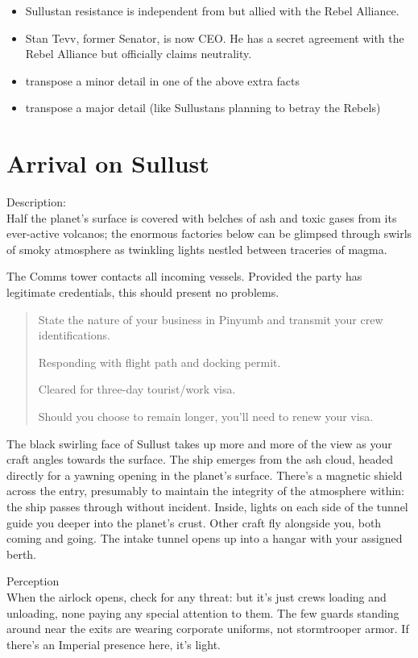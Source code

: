 \documentclass[background]{book}
\begin{document}
\begin{multicols}{2}
\begin{itemize}
    \item \advantage Sullustan resistance is independent from but allied with the Rebel Alliance.
    \item \triumph Stan Tevv, former Senator, is now CEO.  He has a secret agreement with the Rebel Alliance but officially claims neutrality.
    \item \threat transpose a minor detail in one of the above extra facts
    \item \despair transpose a major detail (like Sullustans planning to betray the Rebels)
\end{itemize}


\section{Arrival on Sullust}

Description:\\
Half the planet’s surface is covered with belches of ash and toxic gases from its ever-active volcanos; the enormous factories below can be glimpsed through swirls of smoky atmosphere as twinkling lights nestled between traceries of magma.

The Comms tower contacts all incoming vessels.  Provided the party has legitimate credentials, this should present no problems.

\begin{quote}
State the nature of your business in Pinyumb and transmit your crew identifications.

Responding with flight path and docking permit.

Cleared for three-day tourist/work visa. 

Should you choose to remain longer, you’ll need to renew your visa.
\end{quote}

The black swirling face of Sullust takes up more and more of the view as your craft angles towards the surface. The ship emerges from the ash cloud, headed directly for a yawning opening in the planet’s surface. There’s a magnetic shield across the entry, presumably to maintain the integrity of the atmosphere within: the ship passes through without incident. Inside, lights on each side of the tunnel guide you deeper into the planet’s crust. Other craft fly alongside you, both coming and going. The intake tunnel opens up into a hangar with your assigned berth.

\difficulty \difficulty Perception \\
When the airlock opens, check for any threat: but it’s just crews loading and unloading, none paying any special attention to them. The few guards standing around near the exits are wearing corporate uniforms, not stormtrooper armor. If there’s an Imperial presence here, it’s light.


\end{multicols}
\end{document}
